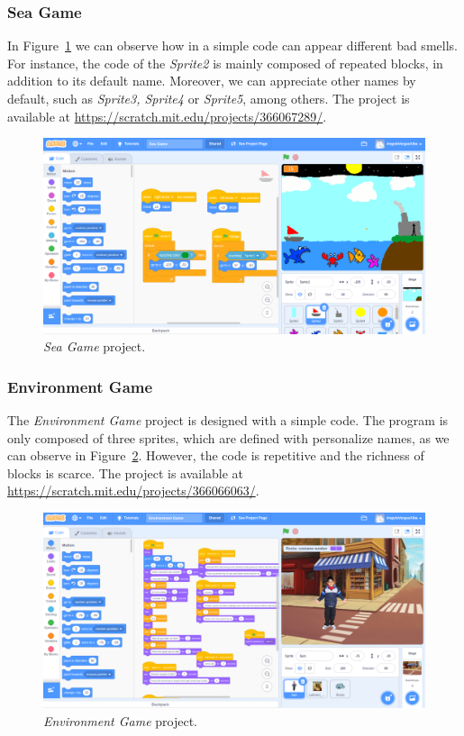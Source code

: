 \subsubsection{Sea Game}
\label{subsubsec:sea_game2}

In Figure~\ref{fig:sea_game} we can observe how in a simple code can appear different bad smells. For instance, the code of the \textit{Sprite2} is mainly composed of repeated blocks, in addition to its default name. Moreover, we can appreciate other names by default, such as \textit{Sprite3, Sprite4} or \textit{Sprite5}, among others. The project is available at \url{https://scratch.mit.edu/projects/366067289/}.

 \begin{figure}
    \centering
    \includegraphics[width=13cm,                         keepaspectratio]{img/sea_game.png}
    \caption{\textit{Sea Game} project.}
    \label{fig:sea_game}
\end{figure}

\subsubsection{Environment Game}
\label{subsubsec:environment_game}

The \textit{Environment Game} project is designed with a simple code. The program is only composed of three sprites, which are defined with personalize names, as we can observe in Figure~\ref{fig:environment_game}. However, the code is repetitive and the richness of blocks is scarce. The project is available at \url{https://scratch.mit.edu/projects/366066063/}.

 \begin{figure}
    \centering
    \includegraphics[width=13cm,                         keepaspectratio]{img/environment_game.png}
    \caption{\textit{Environment Game} project.}
    \label{fig:environment_game}
\end{figure}

